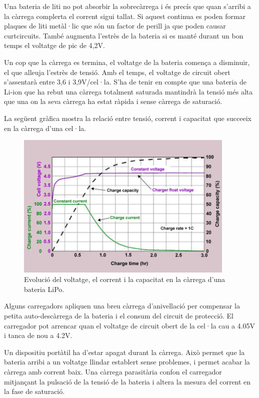 Una bateria de liti no pot absorbir la sobrecàrrega i és precís que quan s'arribi a la càrrega complerta el corrent sigui tallat. Si aquest continua es poden formar plaques de liti metàl·lic que són un factor de perill ja que poden causar curtcircuits. També augmenta l'estrès de la bateria si es manté durant un bon temps el voltatge de pic de 4,2V.

Un cop que la càrrega es termina, el voltatge de la bateria comença a disminuir, el que alleuja l'estrès de tensió. Amb el temps, el voltatge de circuit obert s'assentarà entre 3,6 i 3,9V/cel·la. S'ha de tenir en compte que una bateria de Li-ion que ha rebut una càrrega totalment saturada mantindrà la tensió més alta que una on la seva càrrega ha estat ràpida i sense càrrega de saturació.

La següent gràfica mostra la relació entre tensió, corrent i capacitat que succeeix en la càrrega d'una cel·la.

\begin{figure}[H]
	\centering
    \includegraphics[width=\textwidth, height=7cm] {Bateries/VICgrafica.jpg}
    \caption{Evolució del voltatge, el corrent i la capacitat en la càrrega d'una bateria LiPo.}
\end{figure}

Alguns carregadors apliquen una breu càrrega d'anivellació per compensar la petita auto-descàrrega de la bateria i el consum del circuit de protecció. El carregador pot arrencar quan el voltatge de circuit obert de la cel·la cau a 4.05V i tanca de nou a 4.2V.

Un dispositiu portàtil ha d'estar apagat durant la càrrega. Això permet que la bateria arribi a un voltatge llindar establert sense problemes, i permet acabar la càrrega amb corrent baix. Una càrrega parasitària confon el carregador mitjançant la pulsació de la tensió de la bateria i altera la mesura del corrent en la fase de saturació.

